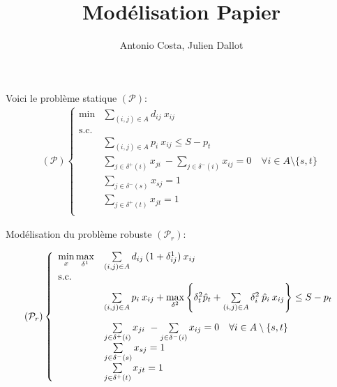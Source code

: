 \documentclass[11pt,a4paper]{exam}
\title{Modélisation Papier}
\author{Antonio Costa, Julien Dallot}
\begin{document}
\maketitle

\begin{questions}
\question Voici le problème statique $\left(\mathcal{P}\right)$:
\begin{align*}
	\left(\mathcal{P}\right) \left\{
	\begin{array}{ll}
		\min &\sum\limits_{(i, j) \in A} d_{ij} \: x_{ij}\\
		\text{s.c.}\\
		&\sum\limits_{(i, j) \in A} p_{i} \: x_{ij} \leq S - p_{t}\\
		&\sum\limits_{j \in \delta^{+}(i)} x_{ji} \ - \sum\limits_{j \in \delta^{-}(i)} x_{ij} = 0 \quad \forall i \in A \setminus \{s, t\}\\
		&\sum\limits_{j \in \delta^{-}(s)} x_{sj} = 1\\
		&\sum\limits_{j \in \delta^{+}(t)} x_{jt} = 1\\
	\end{array}
	\right.
\end{align*}

\question Modélisation du problème robuste $\left(\mathcal{P}_{r}\right)$:

\begin{align*}
	\left(\mathcal{P}_{r}\right) \left\{
	\begin{array}{ll}
		\min\limits_{x} \max\limits_{\delta^{1}} &\sum\limits_{(i, j) \in A} d_{ij} \: (1 + \delta^{1}_{ij}) \: x_{ij}\\
		\text{s.c.}\\
		\vspace{1em} &\sum\limits_{(i, j) \in A} p_{i} \: x_{ij} + \max\limits_{\delta^{2}}\left\{\delta^{2}_{t} \hat{p}_{t} + \sum\limits_{(i, j) \in A} \delta^{2}_{i} \: \hat{p}_{i} \: x_{ij} \right\} \leq S - p_{t}\\
		&\sum\limits_{j \in \delta^{+}(i)} x_{ji} \ - \sum\limits_{j \in \delta^{-}(i)} x_{ij} = 0 \quad \forall i \in A \setminus \{s, t\}\\
		&\sum\limits_{j \in \delta^{-}(s)} x_{sj} = 1\\
		&\sum\limits_{j \in \delta^{+}(t)} x_{jt} = 1\\
	\end{array}
	\right.
\end{align*}

\end{questions}
\end{document}
